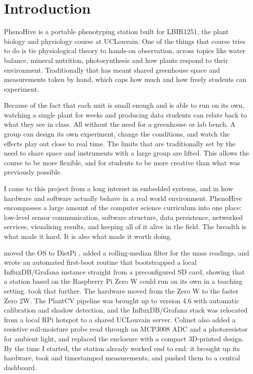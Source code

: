 ﻿\chapter{Introduction}
\label{ch:introduction}

\begingroup
\setlength{\parskip}{0.6em}

PhenoHive is a portable phenotyping station built for LBIR1251, the plant biology and physiology course at UCLouvain. One of the things that course tries to do is tie physiological theory to hands-on observation, across topics like water balance, mineral nutrition, photosynthesis and how plants respond to their environment. Traditionally that has meant shared greenhouse space and measurements taken by hand, which caps how much and how freely students can experiment.

Because of the fact that each unit is small enough and is able to run on its own, watching a single plant for weeks and producing data students can relate back to what they see in class. All without the need for a greenhouse or lab bench. A group can design its own experiment, change the conditions, and watch the effects play out close to real time. The limits that are traditionally set by the need to share space and instruments with a large group are lifted. This allows the course to be more flexible, and for students to be more creative than what was previously possible.


I came to this project from a long interest in embedded systems, and in how hardware and software actually behave in a real world environment. PhenoHive encompasses a large amount of the computer science curriculum into one place: low-level sensor communication, software structure, data persistence, networked services, visualising results, and keeping all of it alive in the field. The breadth is what made it hard. It is also what made it worth doing.

\textcite{goffinet2024} moved the OS to DietPi \parencite{dietpi}, added a rolling-median filter for the mass readings, and wrote an automated first-boot routine that bootstrapped a local InfluxDB/Grafana instance straight from a preconfigured SD card, showing that a station based on the Raspberry Pi Zero W could run on its own in a teaching setting. \textcite{colinet2025} took that further. The hardware moved from the Zero W to the faster Zero 2W. The PlantCV pipeline was brought up to version 4.6 with automatic calibration and shadow detection, and the InfluxDB/Grafana stack was relocated from a local RPi hotspot to a shared UCLouvain server. Colinet also added a resistive soil-moisture probe read through an MCP3008 ADC and a photoresistor for ambient light, and replaced the enclosure with a compact 3D-printed design.
\newline By the time I started, the station already worked end to end: it brought up its hardware, took and timestamped measurements, and pushed them to a central dashboard.

